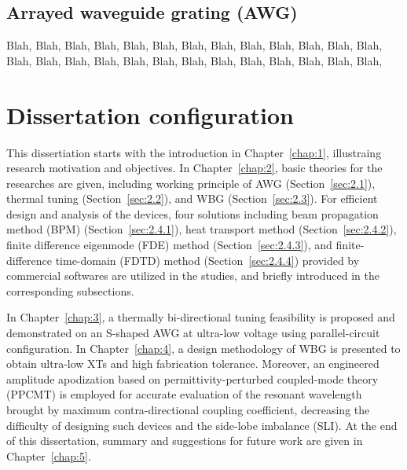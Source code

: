 \subsection{Arrayed waveguide grating (AWG)} \label{sec:1.1.2}
    Blah, Blah, Blah, Blah, Blah, Blah, Blah, Blah, Blah, Blah, Blah, Blah, 
    Blah, Blah, Blah, Blah, Blah, Blah, Blah, Blah, Blah, Blah, Blah, Blah, Blah, Blah, 


\section{Dissertation configuration} \label{sec:1.2}
    This dissertiation starts with the introduction in Chapter~\ref{chap:1}, illustraing research motivation and objectives. 
    In Chapter~\ref{chap:2}, basic theories for the researches are given, 
    including working principle of AWG (Section~\ref{sec:2.1}), 
    thermal tuning (Section~\ref{sec:2.2}), and WBG (Section~\ref{sec:2.3}).
    For efficient design and analysis of the devices, 
    four solutions including beam propagation method (BPM) (Section~\ref{sec:2.4.1}), 
    heat transport method (Section~\ref{sec:2.4.2}), 
    finite difference eigenmode (FDE) method (Section~\ref{sec:2.4.3}), and 
    finite-difference time-domain (FDTD) method (Section~\ref{sec:2.4.4}) 
    provided by commercial softwares are utilized in the studies, 
    and briefly introduced in the corresponding subsections. 
    
    In Chapter~\ref{chap:3}, 
    a thermally bi-directional tuning feasibility is proposed and demonstrated on an S-shaped AWG 
    at ultra-low voltage using parallel-circuit configuration.
    In Chapter~\ref{chap:4}, 
    a design methodology of WBG is presented to obtain ultra-low XTs and high fabrication tolerance. 
    Moreover, an engineered amplitude apodization based on permittivity-perturbed coupled-mode theory (PPCMT) 
    is employed for accurate evaluation of the resonant wavelength brought by maximum contra-directional coupling coefficient, 
    decreasing the difficulty of designing such devices and the side-lobe imbalance (SLI). 
    At the end of this dissertation, summary and suggestions for future work are given in Chapter~\ref{chap:5}.
